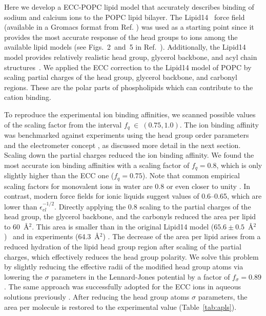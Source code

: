 \documentclass[journal=jpcbfk,manuscript=article]{achemso}
\begin{document}
Here we develop a ECC-POPC lipid model that accurately describes binding 
of sodium and calcium ions to the POPC  lipid bilayer. 
The Lipid14~\cite{dickson14} force field 
(available in a Gromacs format from Ref. ) was used as a starting 
point since 
it provides the most accurate response of the head groups to ions among the available 
lipid models (see Figs.~2~and~5 in Ref.~). Additionally, the Lipid14 model 
provides relatively realistic head group, glycerol backbone, and acyl chain structures~\cite{dickson14,botan15}.
We applied the ECC correction 
to the Lipid14 model of POPC by scaling 
partial charges of the head group, glycerol 
backbone, and carbonyl regions. 
These are the polar parts of phospholipids which can 
contribute to the cation binding. 

To reproduce the experimental ion binding affinities,
we scanned possible values of the scaling factor from the interval $f_q~\in~(0.75, 1.0)$.
The ion binding affinity was benchmarked against experiments
using the head group order parameters and the electrometer concept \cite{seelig87,catte16},
as discussed more detail in the next section.
Scaling down the partial charges reduced the ion binding affinity.
We found the most accurate ion binding affinities with a scaling factor of $f_q = 0.8$,
which is only slightly higher than the ECC one ($f_q=0.75$).
Note that common empirical scaling factors for monovalent ions in water are 0.8 or
even closer to unity \cite{benavides17,skinner14,nacleps}.  In contrast, modern force fields
for ionic liquids suggest values of 0.6--0.65, which are lower than $\epsilon^{-1/2}_{el}$\cite{holm14}.
Directly applying
the 0.8 scaling to the partial charges of the head group, the glycerol backbone, and
the carbonyls reduced the area per lipid to 60~\AA$^2$. This area is smaller than in the
original Lipid14 model ($65.6 \pm 0.5$~\AA$^2$)~\cite{dickson14} and in experiments
(64.3~\AA$^2$) \cite{kucerka11}. The decrease of the area per lipid arises from a
reduced hydration of the lipid head group region after scaling of the partial charges, which effectively
reduces the head group polarity. We solve this problem by slightly reducing the effective radii of
the modified head group atoms via lowering the $\sigma$ parameters in the Lennard-Jones potential by a
factor of $f_\sigma = 0.89$. The same approach was successfully adopted for the ECC ions in aqueous
solutions previously \cite{kohagen14, kohagen16, Pluharova2014, martinek17}. After reducing the head group atoms $\sigma$ parameters, the area per molecule is restored to the experimental value (Table~\ref{tab:apls}). 
\end{document}
